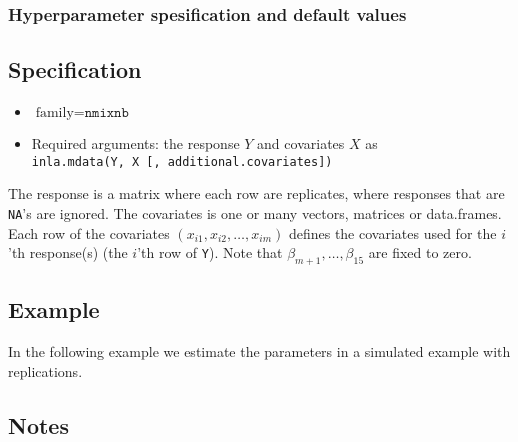 \documentclass[a4paper,11pt]{article}
\def\mmax{15}
\begin{document}
\subsubsection*{Hyperparameter spesification and default values}


\subsection*{Specification}

\begin{itemize}
\item $\text{family}=\texttt{nmixnb}$
\item Required arguments: the response $Y$ and covariates $X$ as\\
    \verb|inla.mdata(Y, X [, additional.covariates])|
\end{itemize}
The response is a matrix where each row are replicates, where
responses that are \texttt{NA}'s are ignored. The covariates is one or
many vectors, matrices or data.frames. Each row of the covariates
$(x_{i1}, x_{i2}, \ldots, x_{im})$ defines the covariates used for the
$i$'th response(s) (the $i$'th row of \texttt{Y}). Note that
$\beta_{m+1}, \ldots, \beta_{\mmax}$ are fixed to zero.


\subsection*{Example}

In the following example we estimate the parameters in a simulated
example with replications.



\subsection*{Notes}
\end{document}
